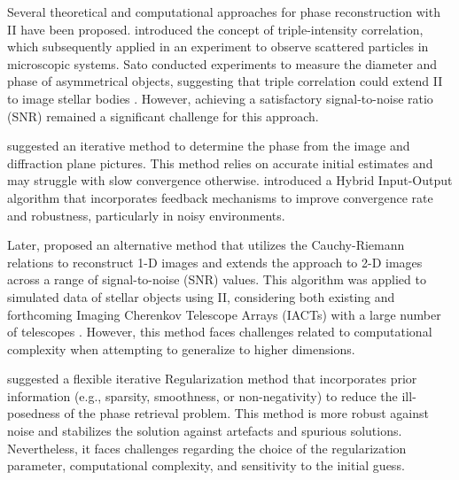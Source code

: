 Several theoretical and computational approaches for phase reconstruction with II have been proposed. \cite{gamo1963triple} introduced the concept of triple-intensity correlation, which \cite{goldberger1963use} subsequently applied in an experiment to observe scattered particles in microscopic systems. Sato conducted experiments to measure the diameter and phase of asymmetrical objects, suggesting that triple correlation could extend II to image stellar bodies \citep{sato1978imaging, sato1979computer, sato1981adaptive}. However, achieving a satisfactory signal-to-noise ratio (SNR) remained a significant challenge for this approach.

\cite{GerchbergSaxton1972} suggested an iterative method to determine the phase from the image and diffraction plane pictures. This method relies on accurate initial estimates and may struggle with slow convergence otherwise. \cite{Fienup1982} introduced a Hybrid Input-Output algorithm that incorporates feedback mechanisms to improve convergence rate and robustness, particularly in noisy environments.

Later, \cite{holmes2010two} proposed an alternative method that utilizes the Cauchy-Riemann relations to reconstruct 1-D images and extends the approach to 2-D images across a range of signal-to-noise (SNR) values. This algorithm was applied to simulated data of stellar objects using II, considering both existing and forthcoming Imaging Cherenkov Telescope Arrays (IACTs) with a large number of telescopes \citep{nunez2010stellar, nunez2012high, nunez2012imaging}. However, this method faces challenges related to computational complexity when attempting to generalize to higher dimensions.

\cite{Li2014} suggested a flexible iterative Regularization method that incorporates prior information (e.g., sparsity, smoothness, or non-negativity) to reduce the ill-posedness of the phase retrieval problem. This method is more robust against noise and stabilizes the solution against artefacts and spurious solutions. Nevertheless, it faces challenges regarding the choice of the regularization parameter, computational complexity, and sensitivity to the initial guess.

